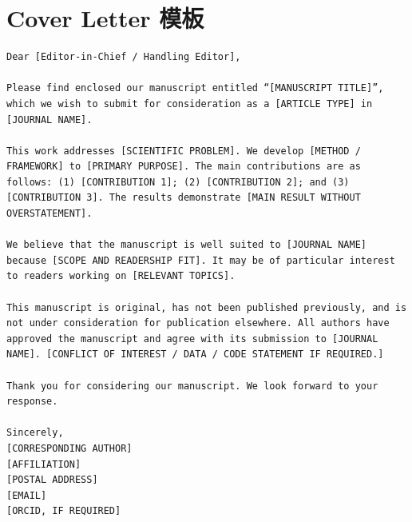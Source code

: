 \documentclass[UTF8,11pt]{ctexart}
\begin{document}
\section{Cover Letter 模板}
\begin{verbatim}
Dear [Editor-in-Chief / Handling Editor],

Please find enclosed our manuscript entitled “[MANUSCRIPT TITLE]”, which we wish to submit for consideration as a [ARTICLE TYPE] in [JOURNAL NAME].

This work addresses [SCIENTIFIC PROBLEM]. We develop [METHOD / FRAMEWORK] to [PRIMARY PURPOSE]. The main contributions are as follows: (1) [CONTRIBUTION 1]; (2) [CONTRIBUTION 2]; and (3) [CONTRIBUTION 3]. The results demonstrate [MAIN RESULT WITHOUT OVERSTATEMENT].

We believe that the manuscript is well suited to [JOURNAL NAME] because [SCOPE AND READERSHIP FIT]. It may be of particular interest to readers working on [RELEVANT TOPICS].

This manuscript is original, has not been published previously, and is not under consideration for publication elsewhere. All authors have approved the manuscript and agree with its submission to [JOURNAL NAME]. [CONFLICT OF INTEREST / DATA / CODE STATEMENT IF REQUIRED.]

Thank you for considering our manuscript. We look forward to your response.

Sincerely,
[CORRESPONDING AUTHOR]
[AFFILIATION]
[POSTAL ADDRESS]
[EMAIL]
[ORCID, IF REQUIRED]
\end{verbatim}
\end{document}
